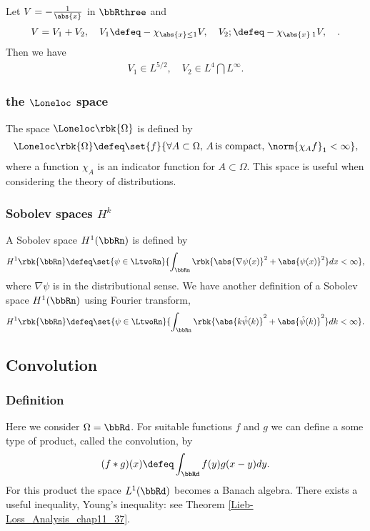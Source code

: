 \documentclass[openany, a4paper, oneside]{jsbook}
\begin{document}
\begin{ex}
 Let $V = - \frac{1}{\abs{x}}$ in $\bbRthree$ and
 \begin{align}
  V = V_1 + V_2, \quad
  V_1
  \defeq
  -\chi_{\abs{x} \leq 1} V, \quad
  V_2;
  \defeq
  -\chi_{\abs{x} \> 1} V, \quad.
 \end{align}
 Then we have
 \begin{align}
  V_1 \in L^{5/2}, \quad
  V_2 \in L^{4} \bigcap L^{\infty}.
 \end{align}
\end{ex}
\subsubsection{the $\Loneloc$ space}

The space $\Loneloc \rbk{\Omega}$ is defined by
\begin{align}
 \Loneloc \rbk{\Omega}
 \defeq
 \set{f}{\forall A \subset \Omega, \, A \, \text{is compact}, \, \norm{\chi_A f}_1 < \infty},
\end{align}
where a function $\chi_A$ is an indicator function for $A \subset \Omega$.
This space is useful when considering the theory of distributions.
\subsubsection{Sobolev spaces $H^k$}

A Sobolev space $H^1 (\bbRn)$ is defined by
\begin{align}
 H^1 \rbk{\bbRn}
 \defeq
 \set{\psi \in \LtwoRn}{\int_{\bbRn} \rbk{\abs{\nabla \psi (x)}^2 + \abs{\psi (x)}^2} dx < \infty},
\end{align}
where $\nabla \psi$ is in the distributional sense.
We have another definition of a Sobolev space $H^1 (\bbRn)$ using Fourier transform,
\begin{align}
 H^1 \rbk{\bbRn}
 \defeq
 \set{\psi \in \LtwoRn}{\int_{\bbRn} \rbk{\abs{k \hat{\psi} (k)}^2 + \abs{\hat{\psi} (k)}^2} d k < \infty}.
\end{align}
\subsection{Convolution}

\subsubsection{Definition}

Here we consider $\Omega = \bbRd$.
For suitable functions $f$ and $g$ we can define a some type of product, called the convolution, by
\begin{align}
 (f * g) (x)
 \defeq
 \int_{\bbRd} f (y) g (x - y) dy.
\end{align}
For this product the space $L^1 (\bbRd)$ becomes a Banach algebra.
There exists a useful inequality, Young's inequality: see Theorem \ref{Lieb-Loss_Analysis_chap11_37}.
\end{document}
